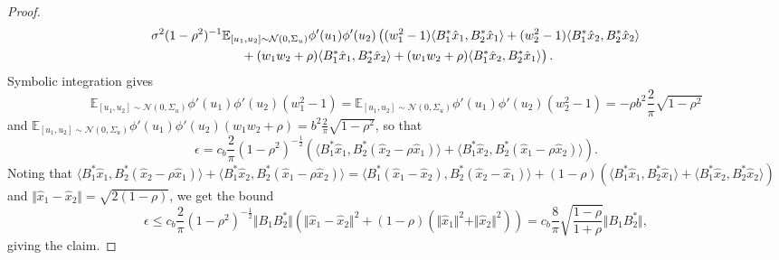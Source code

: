 \documentclass[twoside,11pt]{article}
\newcommand{\E}{\mathbb{E}}
\begin{document}
\begin{proof}
\begin{multline*}
\sigma^2 (1-\rho^2)^{-1} \E_{[u_1,u_2] \sim \mathcal{N}(0,\Sigma_u)} \phi'(u_1) \phi'(u_2) 
\left( (w_1^2 - 1) \langle B_1^* \hat{x}_1, B_2^* \hat{x}_1 \rangle
+ (w_2^2 - 1) \langle B_1^* \hat{x}_2, B_2^* \hat{x}_2 \rangle 
\right. \\ \left. \vphantom{w_1^2}
+ (w_1 w_2 + \rho) \langle B_1^* \hat{x}_1, B_2^* \hat{x}_2 \rangle
+ (w_1 w_2 + \rho) \langle B_1^* \hat{x}_2, B_2^* \hat{x}_1 \rangle
\right).
\end{multline*}
Symbolic integration gives
\[
\E_{[u_1,u_2] \sim \mathcal{N}(0,\Sigma_u)} \phi'(u_1) \phi'(u_2) (w_1^2 - 1) = \E_{[u_1,u_2] \sim \mathcal{N}(0,\Sigma_u)} \phi'(u_1) \phi'(u_2) (w_2^2 - 1) = -\rho b^2 \frac{2}{\pi} \sqrt{1-\rho^2}
\]
and $\E_{[u_1,u_2] \sim \mathcal{N}(0,\Sigma_u)} \phi'(u_1) \phi'(u_2) (w_1 w_2 + \rho) = b^2 \frac{2}{\pi} \sqrt{1-\rho^2}$, so that
\[
\epsilon 
= c_b \frac{2}{\pi} (1-\rho^2)^{-\frac{1}{2}} \left( \langle B_1^* \hat{x}_1, B_2^* (\hat{x}_2 - \rho \hat{x}_1) \rangle + \langle B_1^* \hat{x}_2, B_2^* (\hat{x}_1 - \rho \hat{x}_2) \rangle \right).
\]
Noting that $\langle B_1^* \hat{x}_1, B_2^* (\hat{x}_2 - \rho \hat{x}_1) \rangle + \langle B_1^* \hat{x}_2, B_2^* (\hat{x}_1 - \rho \hat{x}_2) \rangle = \langle B_1^* (\hat{x}_1 - \hat{x}_2), B_2^* (\hat{x}_2 - \hat{x}_1) \rangle + (1-\rho) (\langle B_1^* \hat{x}_1, B_2^* \hat{x}_1 \rangle + \langle B_1^* \hat{x}_2, B_2^* \hat{x}_2 \rangle)$ and $\Vert \hat{x}_1 - \hat{x}_2 \Vert = \sqrt{2(1-\rho)}$, we get the bound
\[
\epsilon \leq c_b \frac{2}{\pi} (1-\rho^2)^{-\frac{1}{2}} \Vert B_1 B_2^* \Vert (\Vert \hat{x}_1 - \hat{x}_2 \Vert^2 + (1-\rho) (\Vert \hat{x}_1 \Vert^2 + \Vert \hat{x}_2 \Vert^2))
= c_b \frac{8}{\pi} \sqrt{\frac{1-\rho}{1+\rho}} \Vert B_1 B_2^* \Vert,
\]
giving the claim.
\end{proof}
\end{document}
